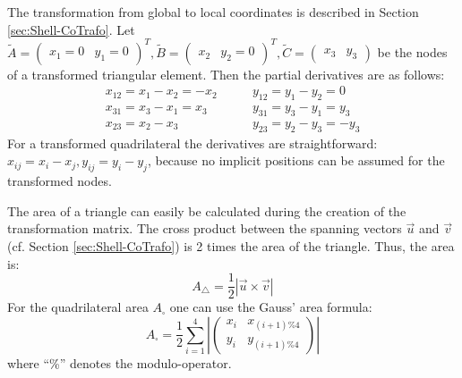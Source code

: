    The transformation from global to local coordinates is described in Section \ref{sec:Shell-CoTrafo}. Let $\tilde{A} = \begin{pmatrix}
   x_1=0 & y_1=0
   \end{pmatrix}^T, \tilde{B} = \begin{pmatrix}
   x_2 & y_2=0
   \end{pmatrix}^T, \tilde{C} = \begin{pmatrix}
   x_3 & y_3
   \end{pmatrix}$ be the nodes of a transformed triangular element. Then the partial derivatives are as follows:
   \begin{align*}
   x_{12} = x_1 - x_2 = -x_2 &\qquad y_{12} = y_1 - y_2 = 0\\
   x_{31} = x_3 - x_1 = x_3  &\qquad y_{31} = y_3 - y_1 = y_3\\
   x_{23} = x_2 - x_3        &\qquad y_{23} = y_2 - y_3 = -y_3
   \end{align*}
   For a transformed quadrilateral the derivatives are straightforward: $x_{ij} = x_i - x_j, y_{ij} = y_i - y_j$, because no implicit positions can be assumed for the transformed nodes.
   
   The area of a triangle can easily be calculated during the creation of the transformation matrix. The cross product between the spanning vectors $\vec{u}$ and $\vec{v}$ (cf. Section \ref{sec:Shell-CoTrafo}) is 2 times the area of the triangle. Thus, the area is:
   \begin{equation*}
   A_\triangle = \frac{1}{2} \left|\vec{u} \times \vec{v}\right|
   \end{equation*}
   For the quadrilateral area $A_\square$ one can use the Gauss' area formula:
   \begin{equation*}
   A_\square = \frac{1}{2} \sum_{i=1}^{4} \left|\begin{pmatrix}
   x_i & x_{(i+1)\%4}\\
   y_i & y_{(i+1)\%4}
   \end{pmatrix}\right|
   \end{equation*}
   where ``\%'' denotes the modulo-operator.
   
